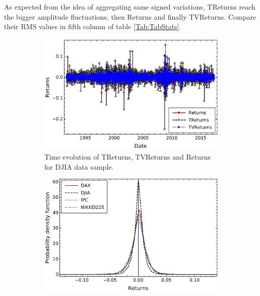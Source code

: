 \documentclass{elsarticle}
\begin{document}
As expected from the idea of aggregating same signed variations, TReturns reach the  bigger amplitude fluctuations, then Returns and finally TVReturns. Compare their RMS values in  fifth column of table \ref{Tab:TabStats}.

\begin{figure}[htb!]
          \begin{subfigure}[b]{0.48\textwidth}
            \centering 
            \includegraphics[width=\textwidth]{figures/Distributions/RetsTRetsTVretsDJIAUnicoNN.pdf}
            \caption[ ]{{Time evolution of TReturns, TVReturns and Returns  for DJIA data sample.}}
            \label{fig:TRandTVRdista}
          \end{subfigure}
                  \hfill
          \begin{subfigure}[b]{0.475\textwidth}
            \centering 
            \includegraphics[width=\textwidth]{figures/Distributions/ReturnDist.pdf}

\end{subfigure}
\end{figure}
\end{document}
